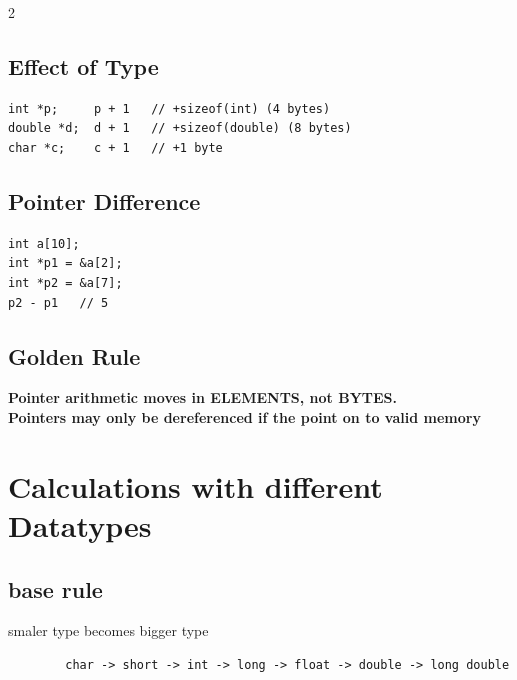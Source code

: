 \documentclass[a4paper,9pt]{article}
\begin{document}
\begin{multicols}{2}
        \subsection{Effect of Type}
        \begin{lstlisting}
int *p;     p + 1   // +sizeof(int) (4 bytes)  
double *d;  d + 1   // +sizeof(double) (8 bytes)  
char *c;    c + 1   // +1 byte  
        \end{lstlisting}
        
        \subsection{Pointer Difference}
        \begin{lstlisting}
int a[10];  
int *p1 = &a[2];  
int *p2 = &a[7];  
p2 - p1   // 5   
        \end{lstlisting}
        
        \subsection*{Golden Rule}
        \begin{center}
            \textbf{Pointer arithmetic moves in ELEMENTS, not BYTES.}\\
            \textbf{Pointers may only be dereferenced if the point on to valid memory}
        \end{center}
    \end{multicols}
    
    \section{Calculations with different Datatypes}
    
    \subsection{base rule}
    smaler type becomes bigger type
    \begin{lstlisting}
        char -> short -> int -> long -> float -> double -> long double 
    \end{lstlisting}
    
\end{document}
